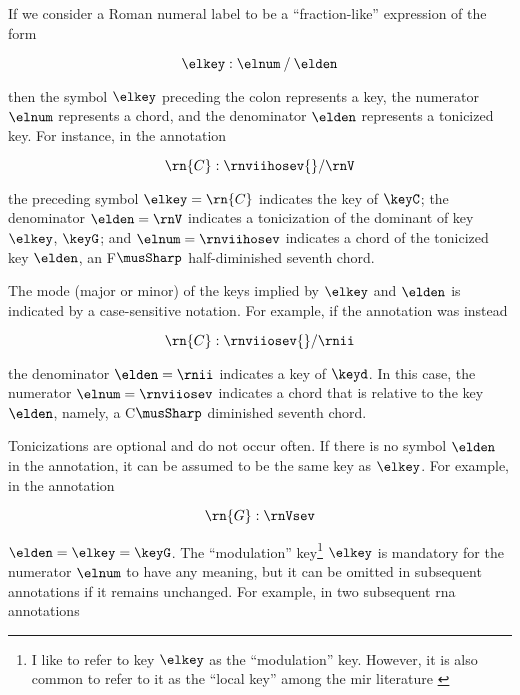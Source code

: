 
If we consider a Roman numeral label to be a
``fraction-like'' expression of the form

\begin{equation}
    \elkey : \elnum \: / \: \elden
\end{equation}

then the symbol $\elkey$ preceding the colon represents a
key, the numerator $\elnum$ represents a chord, and the
denominator $\elden$ represents a tonicized key. For
instance, in the annotation 

\begin{equation}
    \rn{C}:\rnviihosev{}/\rnV
\end{equation}

the preceding symbol $\elkey=\rn{C}$ indicates the key of
$\keyC$; the denominator $\elden = \rnV$ indicates a
tonicization of the dominant of key $\elkey$, $\keyG$; and
$\elnum=\rnviihosev$ indicates a chord of the tonicized key
$\elden$, an F$\musSharp$ half-diminished seventh chord.

The mode (major or minor) of the keys implied by $\elkey$
and $\elden$ is indicated by a case-sensitive notation. For
example, if the annotation was instead

\begin{equation}
    \rn{C}:\rnviiosev{}/\rnii
\end{equation}

the denominator $\elden=\rnii$ indicates a key of $\keyd$.
In this case, the numerator $\elnum = \rnviiosev$ indicates
a chord that is relative to the key $\elden$, namely, a
C$\musSharp$ diminished seventh chord.

Tonicizations are optional and do not occur often. If there
is no symbol $\elden$ in the annotation, it can be assumed
to be the same key as $\elkey$. For example, in the
annotation

\begin{equation}
    \rn{G}:\rnVsev
\end{equation}

$\elden = \elkey = \keyG$. The ``modulation'' key\footnote{I
like to refer to key $\elkey$ as the ``modulation'' key.
However, it is also common to refer to it as the ``local
key'' among the \gls{mir} literature
\parencite{napoleslopez2020local}} $\elkey$ is mandatory for
the numerator $\elnum$ to have any meaning, but it can be
omitted in subsequent annotations if it remains unchanged.
For example, in two subsequent \gls{rna} annotations

